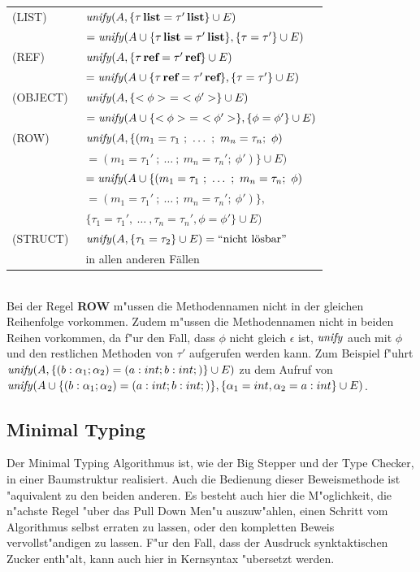 \begin{tabular}{ll}
  (LIST)\     & ${\text{\it unify\/}}(A,\{\tau\,\textbf{list} = \tau'\,\textbf{list} \} \cup E)$\\[1mm]
              & \quad $= {\text{\it unify\/}}(A \cup \{\tau\,\textbf{list} = \tau'\,\textbf{list} \},
                         \{\tau = \tau' \} \cup E)$\\[3mm]
  (REF)\      & ${\text{\it unify\/}}(A,\{\tau\,\textbf{ref} = \tau'\,\textbf{ref} \} \cup E)$\\[1mm]
              & \quad $= {\text{\it unify\/}}(A \cup \{\tau\,\textbf{ref} = \tau'\,\textbf{ref} \},
                         \{\tau = \tau' \} \cup E)$\\[3mm]
  (OBJECT)\   & ${\text{\it unify\/}}(A,\{<\phi>\ =\ <\phi'> \} \cup E)$\\[1mm]
              & \quad $= {\text{\it unify\/}}(A \cup \{<\phi>\ =\ <\phi'> \},
                         \{\phi = \phi' \} \cup E)$\\[3mm]
  (ROW)\      & ${\text{\it unify\/}}(A,\{ (m_1 = \tau_1\ ;\ \ldots\ ;\ m_n = \tau_n;\ \phi)$\\
              & \quad $= (m_1 = \tau_1'\ ;\ \ldots\ ;\ m_n = \tau_n';\ \phi') \} \cup E)$\\[1mm]
              & \quad $= {\text{\it unify\/}}(A \cup \{ (m_1 = \tau_1\ ;\ \ldots\ ;\ m_n = \tau_n;\ \phi)$\\
              & \quad \quad $= (m_1 = \tau_1'\ ;\ \ldots\ ;\ m_n = \tau_n';\ \phi') \},$\\
              & \quad \quad \quad $\{\tau_1 = \tau_1', \ \ldots\ ,\tau_n = \tau_n',
                \phi = \phi' \} \cup E)$\\[3mm]
  (STRUCT)\   & ${\text{\it unify\/}}(A,\{\tau_1 = \tau_2\} \cup E) = \mbox{``nicht l\"osbar''}$\\[1mm]
              & in  allen anderen F\"allen
\end{tabular}\\[6mm]
Bei der Regel {\bf ROW} m"ussen die Methodennamen nicht in der gleichen Reihenfolge
vorkommen. Zudem m"ussen die Methodennamen nicht in beiden Reihen vorkommen, da f"ur den Fall, 
dass $\phi$ nicht gleich $\epsilon$ ist, ${\text{\it unify\/}}$ auch mit $\phi$ und den restlichen Methoden von $\tau'$ 
aufgerufen werden kann. Zum Beispiel f"uhrt ${\text{\it unify\/}} (A,\{ (b: \alpha_1 ; \alpha_2) = (a: int ; b: int ;)\}
\cup E)$ zu dem Aufruf von ${\text{\it unify\/}} (A \cup \{ (b: \alpha_1 ; \alpha_2) = (a: int ; b: int ;)\},
\{\alpha_1 = int, \alpha_2 = a: int\} \cup E)$.

\subsection{Minimal Typing}
Der Minimal Typing Algorithmus ist, wie der Big Stepper und der Type Checker, in einer Baumstruktur realisiert.
Auch die Bedienung dieser Beweismethode ist "aquivalent zu den beiden anderen. Es besteht auch hier die M"oglichkeit,
die n"achste Regel "uber das Pull Down Men"u auszuw"ahlen, einen Schritt vom Algorithmus selbst erraten zu lassen,
oder den kompletten Beweis vervollst"andigen zu lassen. F"ur den Fall, dass der Ausdruck synktaktischen Zucker 
enth"alt, kann auch hier in Kernsyntax "ubersetzt werden.

